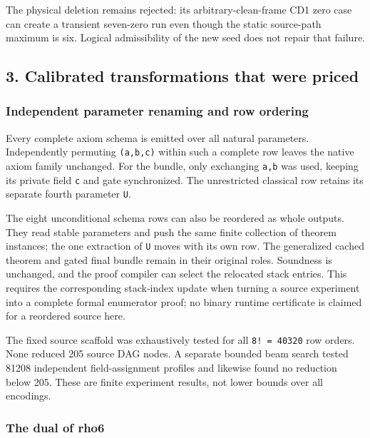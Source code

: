\documentclass[
  11pt,
]{article}
\begin{document}
The physical deletion remains rejected: its arbitrary-clean-frame CD1
zero case can create a transient seven-zero run even though the static
source-path maximum is six. Logical admissibility of the new seed does
not repair that failure.

\hypertarget{calibrated-transformations-that-were-priced}{%
\subsection{3. Calibrated transformations that were
priced}\label{calibrated-transformations-that-were-priced}}

\hypertarget{independent-parameter-renaming-and-row-ordering}{%
\subsubsection{Independent parameter renaming and row
ordering}\label{independent-parameter-renaming-and-row-ordering}}

Every complete axiom schema is emitted over all natural parameters.
Independently permuting \texttt{(a,b,c)} within such a complete row
leaves the native axiom family unchanged. For the bundle, only
exchanging \texttt{a,b} was used, keeping its private field \texttt{c}
and gate synchronized. The unrestricted classical row retains its
separate fourth parameter \texttt{U}.

The eight unconditional schema rows can also be reordered as whole
outputs. They read stable parameters and push the same finite collection
of theorem instances; the one extraction of \texttt{U} moves with its
own row. The generalized cached theorem and gated final bundle remain in
their original roles. Soundness is unchanged, and the proof compiler can
select the relocated stack entries. This requires the corresponding
stack-index update when turning a source experiment into a complete
formal enumerator proof; no binary runtime certificate is claimed for a
reordered source here.

The fixed source scaffold was exhaustively tested for all
\texttt{8!\ =\ 40320} row orders. None reduced 205 source DAG nodes. A
separate bounded beam search tested 81208 independent field-assignment
profiles and likewise found no reduction below 205. These are finite
experiment results, not lower bounds over all encodings.

\hypertarget{the-dual-of-rho6}{%
\subsubsection{The dual of rho6}\label{the-dual-of-rho6}}
\end{document}
